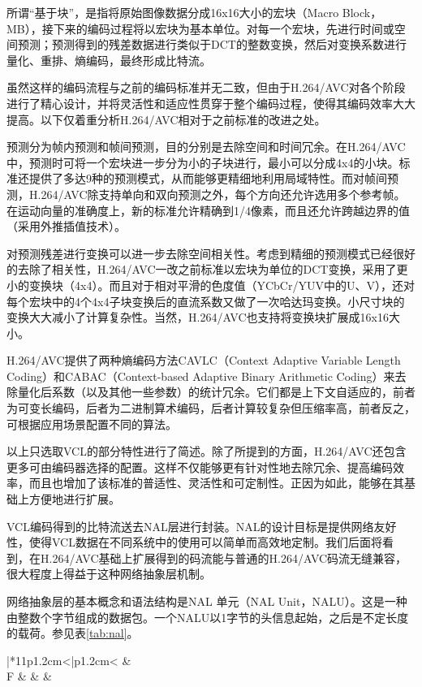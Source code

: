 所谓“基于块”，是指将原始图像数据分成16x16大小的宏块（Macro Block，MB），接下来的编码过程将以宏块为基本单位。对每一个宏块，先进行时间或空间预测；预测得到的残差数据进行类似于DCT的整数变换，然后对变换系数进行量化、重排、熵编码，最终形成比特流。

虽然这样的编码流程与之前的编码标准并无二致，但由于H.264/AVC对各个阶段进行了精心设计，并将灵活性和适应性贯穿于整个编码过程，使得其编码效率大大提高。以下仅着重分析H.264/AVC相对于之前标准的改进之处。

预测分为帧内预测和帧间预测，目的分别是去除空间和时间冗余。在H.264/AVC中，预测时可将一个宏块进一步分为小的子块进行，最小可以分成4x4的小块。标准还提供了多达9种的预测模式，从而能够更精细地利用局域特性。而对帧间预测，H.264/AVC除支持单向和双向预测之外，每个方向还允许选用多个参考帧。在运动向量的准确度上，新的标准允许精确到1/4像素，而且还允许跨越边界的值（采用外推插值技术）。

对预测残差进行变换可以进一步去除空间相关性。考虑到精细的预测模式已经很好的去除了相关性，H.264/AVC一改之前标准以宏块为单位的DCT变换，采用了更小的变换块（4x4）。而且对于相对平滑的色度值（YCbCr/YUV中的U、V），还对每个宏块中的4个4x4子块变换后的直流系数又做了一次哈达玛变换。小尺寸块的变换大大减小了计算复杂性。当然，H.264/AVC也支持将变换块扩展成16x16大小。

H.264/AVC提供了两种熵编码方法CAVLC（Context Adaptive Variable Length Coding）和CABAC（Context-based Adaptive Binary Arithmetic Coding）来去除量化后系数（以及其他一些参数）的统计冗余。它们都是上下文自适应的，前者为可变长编码，后者为二进制算术编码，后者计算较复杂但压缩率高，前者反之，可根据应用场景配置不同的算法。

以上只选取VCL的部分特性进行了简述。除了所提到的方面，H.264/AVC还包含更多可由编码器选择的配置。这样不仅能够更有针对性地去除冗余、提高编码效率，而且也增加了该标准的普适性、灵活性和可定制性。正因为如此，能够在其基础上方便地进行扩展。

VCL编码得到的比特流送去NAL层进行封装。NAL的设计目标是提供网络友好性，使得VCL数据在不同系统中的使用可以简单而高效地定制。我们后面将看到，在H.264/AVC基础上扩展得到的码流能与普通的H.264/AVC码流无缝兼容，很大程度上得益于这种网络抽象层机制。

网络抽象层的基本概念和语法结构是NAL 单元（NAL Unit，NALU）。这是一种由整数个字节组成的数据包。一个NALU以1字节的头信息起始，之后是不定长度的载荷。参见表\ref{tab:nal}。

\begin{table}[h]
\centering
\caption{H.264/AVC中的NAL单元结构}
\label{tab:nal}
\begin{tabular}{|*{11}{p{1.2cm}<{\centering}|}{p{1.2cm}<{\centering}}}
	\hline
	 &  \\ \hline
	F &  &  &  \\ \hline
\end{tabular}
\end{table}

